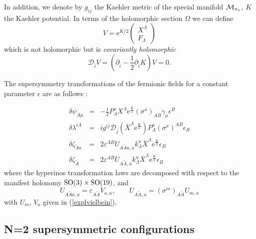 \documentclass[a4paper,12pt]{article}
\begin{document}
\medskip
In addition, we denote by $g_{i\bar j}$ the Kaehler metric of the
special manifold $\mathcal{M}_{n_v}$, $K$ the Kaehler potential. In terms
of the holomorphic section $\Omega$ we can define
$$V=\mathrm{e}^{K/2}\begin{pmatrix}X^\Lambda\\F_\Lambda\end{pmatrix}$$
which is not holomorphic but is {\it covariantly holomorphic}
$$\mathcal{D}_{\bar i}V=(\partial_{\bar i} -\frac 1
2\partial_{\bar i}K)V=0.$$


The  supersymmetry transformations of the fermionic fields for a
constant parameter $\epsilon$  are as follows \cite{abcdffm}:

\begin{eqnarray} \delta\psi_{A\mu}&=&-\frac 1 2 P_\Lambda^xX^\Lambda
\mathrm{e}^{\frac K
2}(\sigma^x)_{AB}\gamma_\mu\epsilon^B\label{susy1}\\
\delta\lambda^{iA}&=&ig^{i\bar j}\mathcal{D}_{\bar j}(\bar
X^\Lambda
\mathrm{e}^{\frac K 2})P_\Lambda^x(\sigma^x)^{AB}\epsilon_B\label{susy2}\\
\delta\zeta_{\tilde A a}&=& 2\varepsilon^{AB}U_{A\tilde A a,
u}k_\Lambda^u\bar
X^\Lambda\mathrm{e}^{\frac K 2}\epsilon_B\label{susy3}\\
\delta\zeta_{\tilde A }&=& 2\varepsilon^{AB}U_{A\tilde A ,
u}k_\Lambda^u\bar X^\Lambda\mathrm{e}^{\frac K
2}\epsilon_B\label{susy4}
\end{eqnarray}
where the hyperinos transformation laws are decomposed with
respect to the manifest holonomy $\mathrm{SO}(3) \times \mathrm{SO}(19)$, and
$$U_{A\tilde A a, u} = \varepsilon_{A\tilde A} V_{a,u}, \qquad
U_{A\tilde A, u} = (\sigma^m)_{A\tilde A} U_{m, u}$$
 with $U_m$, $V_a$ given in (\ref{explvielbein}).

\subsection{N=2 \label{n=2} supersymmetric configurations}
\end{document}
